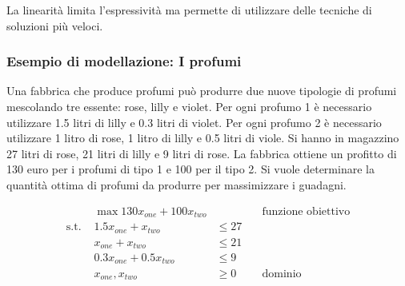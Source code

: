 La linearità limita l'espressività ma permette di utilizzare delle tecniche di soluzioni più veloci.

\subsubsection{Esempio di modellazione: I profumi}

Una fabbrica che produce profumi può produrre due nuove tipologie di profumi mescolando tre essente: rose, lilly e violet. Per ogni profumo 1 è necessario utilizzare 1.5 litri di lilly e 0.3 litri di violet. Per ogni profumo 2 è necessario utilizzare 1 litro di rose, 1 litro di lilly e 0.5 litri di viole.
Si hanno in magazzino 27 litri di rose, 21 litri di lilly e 9 litri di rose. La fabbrica ottiene un profitto di 130 euro per i profumi di tipo 1 e 100 per il tipo 2.
Si vuole determinare la quantità ottima di profumi da produrre per massimizzare i guadagni.

\begin{align*}
&\max 130 x_{one} + 100 x_{two} & & \quad\text{funzione obiettivo} \\
\text{s.t. } &1.5 x_{one} + x_{two} &\leq 27 &\\
					&x_{one} + x_{two} &\leq 21 &\\
					&0.3 x_{one} + 0.5 x_{two} &\leq 9 &\\
					&x_{one}, x_{two} &\geq 0 & \quad\text{dominio}
\end{align*}


